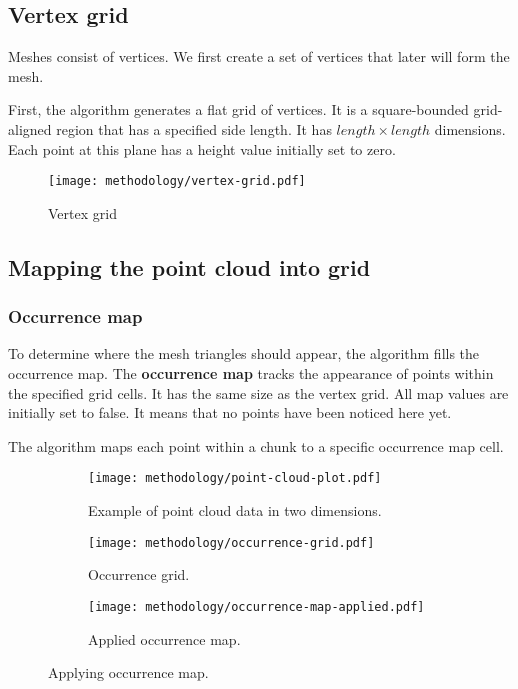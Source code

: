 \subsection{Vertex grid}
\label{subsec:vertex_grid}

Meshes consist of vertices. We first create a set of vertices that later will form the mesh.

First, the algorithm generates a flat grid of vertices. It is a square-bounded grid-aligned region that has a specified side length. It has $length \times length$ dimensions. Each point at this plane has a height value initially set to zero.

\begin{figure}[ht]
    \centering
    \texttt{[image: methodology/vertex-grid.pdf]}
    \caption{Vertex grid}
    \label{fig:vertex_grid}
\end{figure}


\subsection{Mapping the point cloud into grid}
\label{subsec:map_to_grid}

\subsubsection{Occurrence map}

To determine where the mesh triangles should appear, the algorithm fills the occurrence map. The \textbf{occurrence map} tracks the appearance of points within the specified grid cells. It has the same size as the vertex grid. All map values are initially set to false. It means that no points have been noticed here yet.

The algorithm maps each point within a chunk to a specific occurrence map cell.

\begin{figure}[ht]
    \centering
    
    \begin{subfigure}[t]{0.3\textwidth}
        \texttt{[image: methodology/point-cloud-plot.pdf]}
        \caption{Example of point cloud data in two dimensions.}
    \end{subfigure}
    \begin{subfigure}[t]{0.3\textwidth}
        \texttt{[image: methodology/occurrence-grid.pdf]}
        \caption{Occurrence grid.}
    \end{subfigure}
    
    \begin{subfigure}[t]{0.4\textwidth}
        \texttt{[image: methodology/occurrence-map-applied.pdf]}
        \caption{Applied occurrence map.}
    \end{subfigure}
    
    \caption{Applying occurrence map.}
    \label{fig:occurrence_map}
\end{figure}

